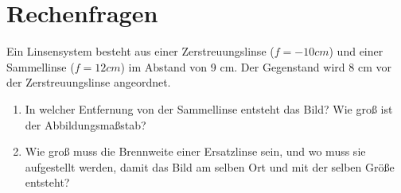 \documentclass[12pt,a4paper,ngerman]{article}
\begin{document}
\pagebreak
\section*{Rechenfragen}


\begin{framed}
Ein Linsensystem besteht aus einer Zerstreuungslinse ($f=-10cm$) und einer Sammellinse ($f=12cm$) im Abstand von 9 cm. Der Gegenstand wird 8 cm vor der Zerstreuungslinse angeordnet.
\begin{enumerate}
\item In welcher Entfernung von der Sammellinse entsteht das Bild? Wie groß ist der Abbildungsmaßstab?
\item Wie groß muss die Brennweite einer Ersatzlinse sein, und wo muss sie aufgestellt werden, damit das Bild am selben Ort und mit der selben Größe entsteht?
\end{enumerate}
\end{framed}
\end{document}
